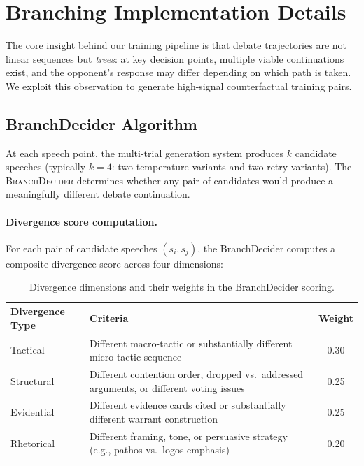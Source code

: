 \section{Branching Implementation Details}
\label{app:branching}

The core insight behind our training pipeline is that debate trajectories
are not linear sequences but \emph{trees}: at key decision points,
multiple viable continuations exist, and the opponent's response may differ
depending on which path is taken. We exploit this observation to generate
high-signal counterfactual training pairs.

\subsection{BranchDecider Algorithm}

At each speech point, the multi-trial generation system produces $k$
candidate speeches (typically $k{=}4$: two temperature variants and two
retry variants). The \textsc{BranchDecider} determines whether any pair
of candidates would produce a meaningfully different debate continuation.

\paragraph{Divergence score computation.}
For each pair of candidate speeches $(s_i, s_j)$, the BranchDecider
computes a composite divergence score across four dimensions:

\begin{table}[h]
\centering
\small
\begin{tabular}{lp{7cm}c}
\toprule
\textbf{Divergence Type} & \textbf{Criteria} & \textbf{Weight} \\
\midrule
Tactical & Different macro-tactic or substantially different micro-tactic sequence & 0.30 \\
Structural & Different contention order, dropped vs.\ addressed arguments, or different voting issues & 0.25 \\
Evidential & Different evidence cards cited or substantially different warrant construction & 0.25 \\
Rhetorical & Different framing, tone, or persuasive strategy (e.g., pathos vs.\ logos emphasis) & 0.20 \\
\bottomrule
\end{tabular}
\caption{Divergence dimensions and their weights in the BranchDecider scoring.}
\label{tab:divergence_types}
\end{table}

